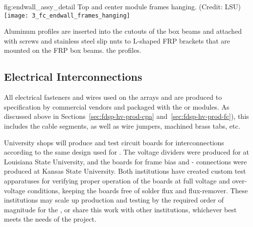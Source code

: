 \begin{dunefigure}{fig:endwall_assy_detail}{%
Top and center  module frames hanging. (Credit: LSU)}
\texttt{[image: 3\_fc\_endwall\_frames\_hanging]}
\end{dunefigure}


Aluminum profiles are inserted into the cutouts of the box beams and attached with screws and stainless steel slip nuts to L-shaped FRP brackets that are mounted on the 
FRP box beams. 
the profiles.

\subsection{Electrical Interconnections}
\label{sec:fdsp-hv-prod-interconnect}

All electrical fasteners and wires used on the  arrays and  are produced
to specification by commercial vendors and packaged with the  or  modules.  
As discussed above in Sections~\ref{sec:fdsp-hv-prod-cpa} and~\ref{sec:fdsp-hv-prod-fc}), 
this includes the  cable segments, as well as wire jumpers, machined brass
tabs, etc.

University shops will produce and test circuit boards for %
 interconnections according to the same design used for .  The  voltage dividers were produced for  at Louisiana State University, and the boards for  frame bias and - connections were produced at Kansas State University.
Both institutions have created custom test apparatuses for verifying proper operation of the boards at full voltage and over-voltage conditions, keeping the boards free of solder flux and flux-remover.  These institutions may scale up production and testing by the required order of magnitude for the , or share this work with other institutions, whichever best meets the needs of the project. %

